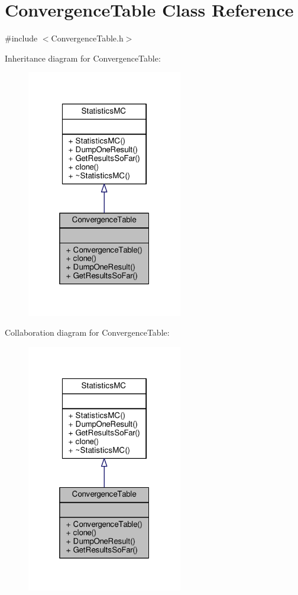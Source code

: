 \hypertarget{classConvergenceTable}{}\section{Convergence\+Table Class Reference}
\label{classConvergenceTable}


{\ttfamily \#include $<$Convergence\+Table.\+h$>$}



Inheritance diagram for Convergence\+Table\+:
\nopagebreak
\begin{figure}[H]
\begin{center}
\leavevmode
\includegraphics[width=193pt]{classConvergenceTable__inherit__graph}
\end{center}
\end{figure}


Collaboration diagram for Convergence\+Table\+:
\nopagebreak
\begin{figure}[H]
\begin{center}
\leavevmode
\includegraphics[width=193pt]{classConvergenceTable__coll__graph}
\end{center}
\end{figure}

